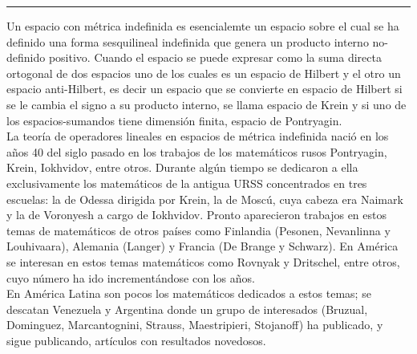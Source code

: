 \begin{titlepage}
\begin{minipage}{0.5\linewidth}
\begin{minipage}{0.45\linewidth}
    \begin{flushright}
        \printauthor
    \end{flushright}
\end{minipage} \hspace{0pt}
%
\begin{minipage}{0.02\linewidth}
      \color{ptctitle} \rule{1pt}{310pt}
\end{minipage} 
\end{minipage}
\hspace*{-4.5cm}
%
\begin{minipage}{0.85\linewidth}
\begin{minipage}{0.85\linewidth}
\footnotesize
\vspace{5pt}
    \begin{resumen}     
Un espacio con m\'etrica indefinida es esencialemte un espacio sobre el cual se ha definido una forma sesquilineal indefinida que genera un producto interno no-definido positivo. Cuando el espacio se puede expresar como la suma directa ortogonal de dos espacios uno de los cuales es un espacio de Hilbert y el otro un espacio anti-Hilbert, es decir un espacio que se convierte en espacio de Hilbert si se le cambia el signo a su producto interno, se llama espacio de Krein y si uno de los espacios-sumandos tiene dimensi\'on finita, espacio de Pontryagin.\\
La teor\'ia de operadores lineales en espacios de m\'etrica indefinida naci\'o en los a\~nos 40 del siglo pasado en los trabajos de los matem\'aticos rusos Pontryagin, Krein, Iokhvidov, entre otros. Durante alg\'un tiempo se dedicaron a ella exclusivamente los matem\'aticos de la antigua URSS concentrados en tres escuelas: la de Odessa dirigida por Krein, la de Mosc\'u, cuya cabeza era Naimark y la de Voronyesh a cargo de Iokhvidov. Pronto aparecieron trabajos en estos temas de matem\'aticos de otros pa\'ises como Finlandia (Pesonen, Nevanlinna y Louhivaara), Alemania (Langer) y Francia (De Brange y Schwarz). En Am\'erica se interesan en estos temas matem\'aticos como Rovnyak y Dritschel, entre otros, cuyo n\'umero ha ido increment\'andose con los a\~nos.\\
En Am\'erica Latina son pocos los matem\'aticos dedicados a estos temas; se descatan Venezuela y Argentina donde un grupo de interesados (Bruzual, Dominguez, Marcantognini, Strauss, Maestripieri, Stojanoff) ha publicado, y sigue publicando, art\'iculos con resultados novedosos.\\

\end{resumen}
\end{minipage}
\end{minipage}
\end{titlepage}

